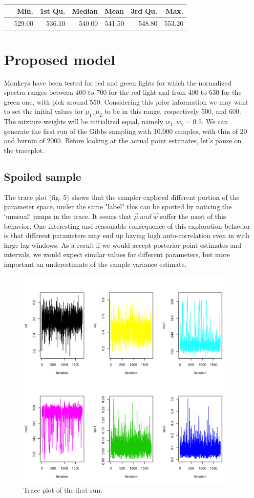 \documentclass{article}
\begin{document}
\begin{table}[ht]
\centering
\begin{tabular}{rrrrrrr}
  \hline
 & Min. & 1st Qu. & Median & Mean & 3rd Qu. & Max. \\ 
  \hline
 & 529.00 & 536.10 & 540.00 & 541.50 & 548.80 & 553.20 \\ 
   \hline
\end{tabular}
\end{table}


\section{Proposed model}
Monkeys have been tested for red and green lights for which the normalized spectra ranges between 400 to 700 for the red light and from 400 to 630 for the green one, with pick around 550. Considering this prior information we may want to set the initial values for $\mu_1, \mu_2$ to be in this range, respectively 500, and 600. The mixture weights will be initialized equal, namely $w_1, w_2 = 0.5$.
We can generate the first run of the Gibbs sampling with 10.000 samples, with thin of 20 and burnin of 2000. Before looking at the actual point estimates, let's pause on the traceplot.

\subsection{Spoiled sample}
The trace plot (fig. 5) shows that the sampler explored different portion of the parameter space, under the same "label" this can be spotted by noticing the `unusual` jumps in the trace. It seems that $\vec \mu \ and \  \vec w$ suffer the most of this behavior. One interesting and reasonable consequence of this exploration behavior is that different parameters may end up having high auto-correlation even in with large lag windows. As a result if we would accept posterior point estimates and intervals, we would expect similar values for different parameters, but more important an underestimate of the sample variance estimate. 

\begin{figure}[h!]
    \centering
    \includegraphics[width=.7\textwidth]{plot_6.png}
    \caption{Trace plot of the first run.}
    \label{Monkey measurement}
\end{figure}
\end{document}
